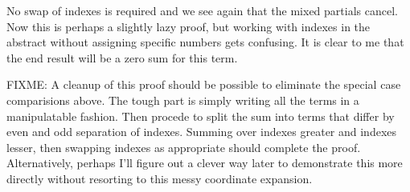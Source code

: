 \documentclass{article}
\begin{document}
No swap of indexes is required and we see again that the mixed partials cancel.  Now this is perhaps a slightly lazy proof, but working with
indexes in the abstract without assigning specific numbers gets confusing.  It is clear to me that the end result will be a zero sum for this term.

FIXME: A cleanup of this proof should be possible to eliminate the special case comparisions above.  The tough part is simply writing all the terms
in a manipulatable fashion.  Then procede to split the sum into terms that differ by even and odd separation of indexes.  Summing over indexes greater and indexes lesser, then swapping indexes as appropriate should complete the proof.
Alternatively, perhaps I'll figure out a clever way later to demonstrate this more directly without resorting to this messy coordinate expansion.


      
\end{document}
